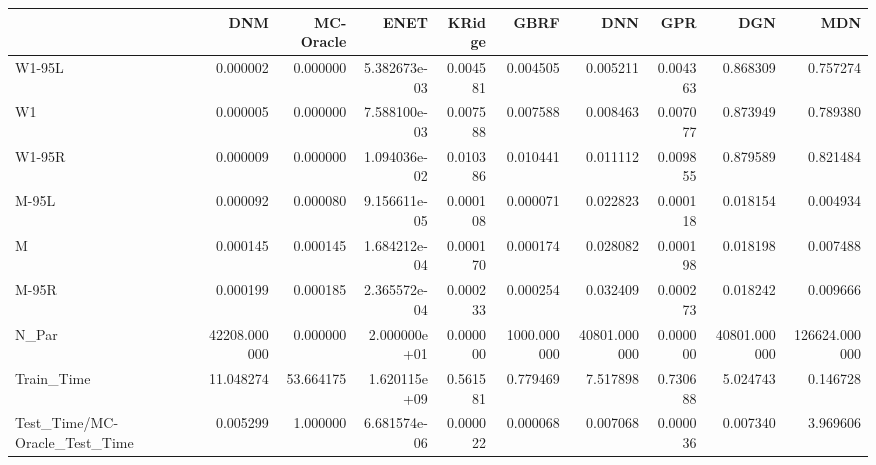 \begin{tabular}{lrrrrrrrrr}
\toprule
{} &           DNM &  MC-Oracle &          ENET &    KRidge &         GBRF &           DNN &       GPR &           DGN &            MDN \\
\midrule
W1-95L                        &      0.000002 &   0.000000 &  5.382673e-03 &  0.004581 &     0.004505 &      0.005211 &  0.004363 &      0.868309 &       0.757274 \\
W1                            &      0.000005 &   0.000000 &  7.588100e-03 &  0.007588 &     0.007588 &      0.008463 &  0.007077 &      0.873949 &       0.789380 \\
W1-95R                        &      0.000009 &   0.000000 &  1.094036e-02 &  0.010386 &     0.010441 &      0.011112 &  0.009855 &      0.879589 &       0.821484 \\
M-95L                         &      0.000092 &   0.000080 &  9.156611e-05 &  0.000108 &     0.000071 &      0.022823 &  0.000118 &      0.018154 &       0.004934 \\
M                             &      0.000145 &   0.000145 &  1.684212e-04 &  0.000170 &     0.000174 &      0.028082 &  0.000198 &      0.018198 &       0.007488 \\
M-95R                         &      0.000199 &   0.000185 &  2.365572e-04 &  0.000233 &     0.000254 &      0.032409 &  0.000273 &      0.018242 &       0.009666 \\
N\_Par                         &  42208.000000 &   0.000000 &  2.000000e+01 &  0.000000 &  1000.000000 &  40801.000000 &  0.000000 &  40801.000000 &  126624.000000 \\
Train\_Time                    &     11.048274 &  53.664175 &  1.620115e+09 &  0.561581 &     0.779469 &      7.517898 &  0.730688 &      5.024743 &       0.146728 \\
Test\_Time/MC-Oracle\_Test\_Time &      0.005299 &   1.000000 &  6.681574e-06 &  0.000022 &     0.000068 &      0.007068 &  0.000036 &      0.007340 &       3.969606 \\
\bottomrule
\end{tabular}
